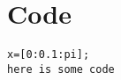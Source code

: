 \chapter[Code]{Code}
\label{AppendixA}

\begin{verbatim}
x=[0:0.1:pi];
here is some code
\end{verbatim}